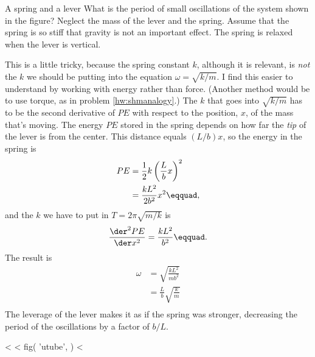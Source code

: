         \begin{eg}{A spring and a lever}\label{eg:leverspring}
        \egquestion
        What is the period of small oscillations of the system shown in the figure?
        Neglect the mass of the lever and the spring. Assume that the spring is
        so stiff that gravity is not an important effect. The spring is relaxed
        when the lever is vertical.
        
        \eganswer
        This is a little tricky, because the spring constant $k$, although it
        is relevant, is \emph{not} the $k$ we should be putting into the equation
        $\omega=\sqrt{k/m}$.
        I find this easier to understand by working with energy rather than force.
        (Another method would be to use torque, as in problem \ref{hw:shmanalogy}.)
        The $k$ that goes into $\sqrt{k/m}$ has to be the second
        derivative of $PE$ with respect to the position, $x$, of the mass that's
        moving. The energy $PE$ stored in the spring depends on how far the
        \emph{tip} of the lever is from the center. This distance equals
        $(L/b)x$, so the energy in the spring is
        \begin{align*}
                PE        &= \frac{1}{2}k\left(\frac{L}{b}x\right)^2 \\
                        &= \frac{kL^2}{2b^2}x^2\eqquad, \\
        \end{align*}
        and the $k$ we have to put in $T=2\pi\sqrt{m/k}$ is
        \begin{equation*}
                \frac{\der^2 PE}{\der x^2}        =  \frac{kL^2}{b^2}\eqquad. \\
        \end{equation*}
        The result is
        \begin{align*}
                \omega  &=  \sqrt{\frac{kL^2}{mb^2}} \\
                        &=  \frac{L}{b}\sqrt{\frac{k}{m}} \\
        \end{align*}
        The leverage of the lever makes it as if the spring was stronger,
        decreasing the period of the oscillations by a factor of $b/L$.
        \end{eg}
<%
<%
  fig(
    'utube',
  )
<%

